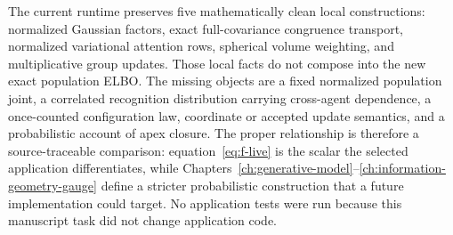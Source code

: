 The current runtime preserves five mathematically clean local constructions: normalized Gaussian factors, exact full-covariance congruence transport, normalized variational attention rows, spherical volume weighting, and multiplicative group updates. Those local facts do not compose into the new exact population ELBO. The missing objects are a fixed normalized population joint, a correlated recognition distribution carrying cross-agent dependence, a once-counted configuration law, coordinate or accepted update semantics, and a probabilistic account of apex closure. The proper relationship is therefore a source-traceable comparison: equation~\eqref{eq:f-live} is the scalar the selected application differentiates, while Chapters~\ref{ch:generative-model}--\ref{ch:information-geometry-gauge} define a stricter probabilistic construction that a future implementation could target. No application tests were run because this manuscript task did not change application code.
